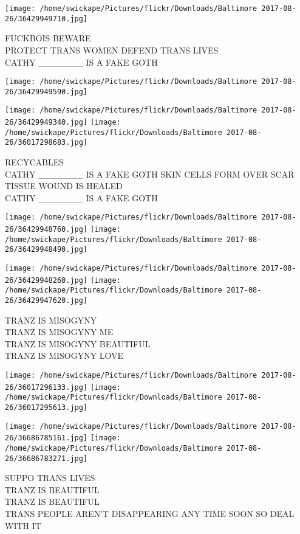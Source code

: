 \documentclass[10pt,letterpaper]{article}
\begin{document}
\texttt{[image: /home/swickape/Pictures/flickr/Downloads/Baltimore 2017-08-26/36429949710.jpg]}

FUCKBOIS BEWARE\\
PROTECT TRANS WOMEN DEFEND TRANS LIVES\\
CATHY \_\_\_\_\_\_\_ IS A FAKE GOTH\\
\pagebreak

\texttt{[image: /home/swickape/Pictures/flickr/Downloads/Baltimore 2017-08-26/36429949590.jpg]}

\vspace{0.25in}
\texttt{[image: /home/swickape/Pictures/flickr/Downloads/Baltimore 2017-08-26/36429949340.jpg]}
\texttt{[image: /home/swickape/Pictures/flickr/Downloads/Baltimore 2017-08-26/36017298683.jpg]}

RECYCABLES\\
CATHY \_\_\_\_\_\_\_ IS A FAKE GOTH SKIN CELLS FORM OVER SCAR TISSUE WOUND IS HEALED\\
CATHY \_\_\_\_\_\_\_ IS A FAKE GOTH\\
\pagebreak

\texttt{[image: /home/swickape/Pictures/flickr/Downloads/Baltimore 2017-08-26/36429948760.jpg]}
\texttt{[image: /home/swickape/Pictures/flickr/Downloads/Baltimore 2017-08-26/36429948490.jpg]}

\texttt{[image: /home/swickape/Pictures/flickr/Downloads/Baltimore 2017-08-26/36429948260.jpg]}
\texttt{[image: /home/swickape/Pictures/flickr/Downloads/Baltimore 2017-08-26/36429947620.jpg]}

TRANZ IS MISOGYNY\\
TRANZ IS MISOGYNY ME\\
TRANZ IS MISOGYNY BEAUTIFUL\\
TRANZ IS MISOGYNY LOVE\\
\pagebreak

\texttt{[image: /home/swickape/Pictures/flickr/Downloads/Baltimore 2017-08-26/36017296133.jpg]}
\texttt{[image: /home/swickape/Pictures/flickr/Downloads/Baltimore 2017-08-26/36017295613.jpg]}

\texttt{[image: /home/swickape/Pictures/flickr/Downloads/Baltimore 2017-08-26/36686785161.jpg]}
\texttt{[image: /home/swickape/Pictures/flickr/Downloads/Baltimore 2017-08-26/36686783271.jpg]}

SUPPO TRANS LIVES\\
TRANZ IS BEAUTIFUL\\
TRANZ IS BEAUTIFUL\\
TRANS PEOPLE AREN'T DISAPPEARING ANY TIME SOON SO DEAL WITH IT\\
\pagebreak
\end{document}
